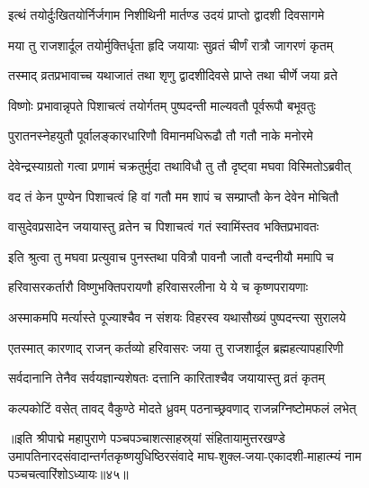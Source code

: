 \twolineshloka
{इत्थं तयोर्दुःखितयोर्निर्जगाम निशीथिनी}
{मार्तण्ड उदयं प्राप्तो द्वादशी दिवसागमे}%

\twolineshloka
{मया तु राजशार्दूल तयोर्मुक्तिर्धृता हृदि}
{जयायाः सुव्रतं चीर्णं रात्रौ जागरणं कृतम्}%

\twolineshloka
{तस्माद् व्रतप्रभावाच्च यथाजातं तथा शृणु}
{द्वादशीदिवसे प्राप्ते तथा चीर्णे जया व्रते}%

\twolineshloka
{विष्णोः प्रभावान्नृपते पिशाचत्वं तयोर्गतम्}
{पुष्पदन्ती माल्यवतौ पूर्वरूपौ बभूवतुः}%

\twolineshloka
{पुरातनस्नेहयुतौ  पूर्वालङ्कारधारिणौ}
{विमानमधिरूढौ तौ गतौ नाके मनोरमे}%

\twolineshloka
{देवेन्द्रस्याग्रतो गत्वा प्रणामं चक्रतुर्मुदा}
{तथाविधौ तु तौ दृष्ट्वा मघवा विस्मितोऽब्रवीत्}%


\twolineshloka
{वद तं केन पुण्येन पिशाचत्वं हि वां गतौ}
{मम शापं च सम्प्राप्तौ केन देवेन मोचितौ}%


\twolineshloka
{वासुदेवप्रसादेन जयायास्तु व्रतेन च}
{पिशाचत्वं गतं स्वामिंस्तव भक्तिप्रभावतः}%

\twolineshloka
{इति श्रुत्वा तु मघवा प्रत्युवाच पुनस्तथा}
{पवित्रौ पावनौ जातौ वन्दनीयौ ममापि च}%

\twolineshloka
{हरिवासरकर्तारौ विष्णुभक्तिपरायणौ}
{हरिवासरलीना ये ये च कृष्णपरायणाः}%

\twolineshloka
{अस्माकमपि मर्त्यास्ते पूज्याश्चैव न संशयः}
{विहरस्व यथासौख्यं पुष्पदन्त्या सुरालये}%


\twolineshloka
{एतस्मात् कारणाद् राजन् कर्तव्यो हरिवासरः}
{जया तु राजशार्दूल ब्रह्महत्यापहारिणी}%

\twolineshloka
{सर्वदानानि तेनैव सर्वयज्ञान्यशेषतः}
{दत्तानि कारिताश्चैव जयायास्तु व्रतं कृतम्}%

\twolineshloka
{कल्पकोटिं वसेत् तावद् वैकुण्ठे मोदते ध्रुवम्}
{पठनाच्छ्रवणाद् राजन्नग्निष्टोमफलं लभेत्}%

॥इति श्रीपाद्मे महापुराणे पञ्चपञ्चाशत्साहस्र्यां संहितायामुत्तरखण्डे उमापतिनारदसंवादान्तर्गतकृष्णयुधिष्ठिरसंवादे माघ-शुक्ल-जया-एकादशी-माहात्म्यं नाम पञ्चचत्वारिंशोऽध्यायः॥४५॥

\genMangalaShloka

\hyperref[sec:ekadashi_mahatmyam_padma_puranam]{\closesub}
\clearpage

\label{sec:padma-phalguna-krishna-vijaya}

